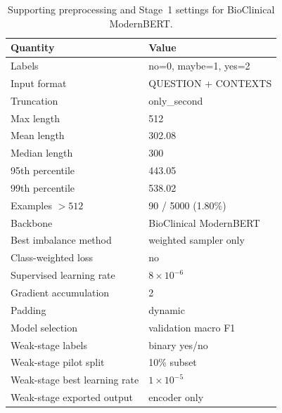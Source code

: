 \documentclass{article}
\begin{document}
\begin{table}[H]
\centering
\caption{Supporting preprocessing and Stage~1 settings for BioClinical ModernBERT.}
\label{tab:bcb_appendix_stage1}
\small
\begin{tabular}{ll}
\hline
\textbf{Quantity} & \textbf{Value} \\
\hline
Labels & no=0, maybe=1, yes=2 \\
Input format & QUESTION + CONTEXTS \\
Truncation & only\_second \\
Max length & 512 \\
Mean length & 302.08 \\
Median length & 300 \\
95th percentile & 443.05 \\
99th percentile & 538.02 \\
Examples $>512$ & 90 / 5000 (1.80\%) \\
Backbone & BioClinical ModernBERT \\
Best imbalance method & weighted sampler only \\
Class-weighted loss & no \\
Supervised learning rate & $8\times10^{-6}$ \\
Gradient accumulation & 2 \\
Padding & dynamic \\
Model selection & validation macro F1 \\
Weak-stage labels & binary yes/no \\
Weak-stage pilot split & 10\% subset \\
Weak-stage best learning rate & $1\times10^{-5}$ \\
Weak-stage exported output & encoder only \\
\hline
\end{tabular}
\end{table}
\end{document}
